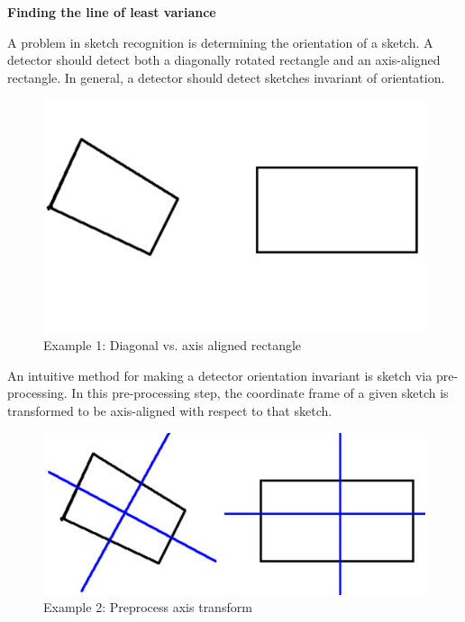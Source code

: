 \documentclass{article}
\begin{document}
{ \Large \bf 
Finding the line of least variance\\

}

A problem in sketch recognition is determining the orientation of a sketch. A detector should detect both a diagonally rotated rectangle and an axis-aligned rectangle. In general, a detector should detect sketches invariant of orientation. 
\begin{figure}[htbp]
\begin{center}
\includegraphics[scale=.5, clip=true, trim=0 100 0 50]{example1}
\caption{Example 1: Diagonal vs. axis aligned rectangle}
\label{ex1}
\end{center}
\end{figure}

An intuitive method for making a detector orientation invariant is sketch via pre-processing. In this pre-processing step, the coordinate frame of a given sketch is transformed to be axis-aligned with respect to that sketch.

\begin{figure}[htbp]
\begin{center}
\includegraphics[scale=.5]{example2}
\caption{Example 2: Preprocess axis transform}
\label{ex2}
\end{center}
\end{figure}
\end{document}
